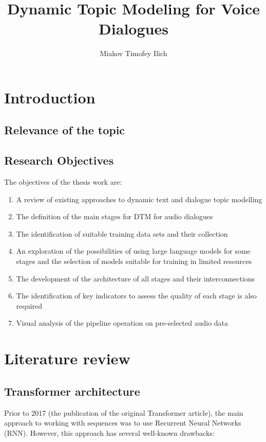 \documentclass[PMI,VKR]{HSEUniversity}
\title{Dynamic Topic Modeling for Voice Dialogues}
\author{Miakov Timofey Ilich}
\begin{document}
\maketitle

\chapter{Introduction}

\section{Relevance of the topic}

\section{Research Objectives}
The objectives of the thesis work are:
\begin{enumerate}
    \item A review of existing approaches to dynamic text and dialogue topic modelling
    \item The definition of the main stages for DTM for audio dialogues
    \item The identification of suitable training data sets and their collection
    \item An exploration of the possibilities of using large language models for some stages and the selection of models suitable for training in limited resources
    \item The development of the architecture of all stages and their interconnections
    \item The identification of key indicators to assess the quality of each stage is also required
    \item Visual analysis of the pipeline operation on pre-selected audio data
\end{enumerate}


\chapter{Literature review}

\section{Transformer architecture}

Prior to 2017 (the publication of the original Transformer article), the main approach to working with sequences was to use Recurrent Neural Networks (RNN). However, this approach has several well-known drawbacks:
\end{document}
